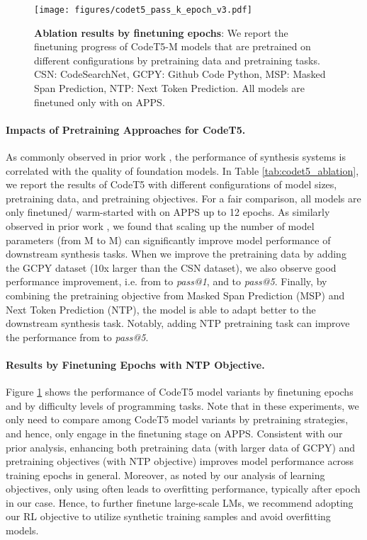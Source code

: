 \documentclass{article}
\begin{document}
\begin{figure}[t]
	\centering
	\resizebox{1.0\textwidth}{!} {
	\texttt{[image: figures/codet5\_pass\_k\_epoch\_v3.pdf]}
	}
	\caption{
	\textbf{Ablation results by finetuning epochs}:
	We report the finetuning progress of CodeT5-M models that are pretrained on different configurations by pretraining data and pretraining tasks. CSN: CodeSearchNet, GCPY: Github Code Python, MSP: Masked Span Prediction, NTP: Next Token Prediction. 
	All models are finetuned only with  on APPS.
	}
	\label{app_fig:codet5_apps}
\end{figure}

\paragraph{Impacts of Pretraining Approaches for CodeT5.}
As commonly observed in prior work \citep{austin2021program, chen2021evaluating, li2022competition}, the performance of synthesis systems is correlated with the quality of foundation models. 
In Table \ref{tab:codet5_ablation}, we report the results of CodeT5 with different configurations of model sizes, pretraining data, and pretraining objectives. 
For a fair comparison, all models are only finetuned/ warm-started with  on APPS up to 12 epochs. 
As similarly observed in prior work \citep{chen2021evaluating, austin2021program}, we found that scaling up the number of model parameters (from M to M) can significantly improve model performance of downstream synthesis tasks. 
When we improve the pretraining data by adding the GCPY dataset (10x larger than the CSN dataset), we also observe good performance improvement, i.e. from  to  \emph{pass@1}, and  to  \emph{pass@5}. 
Finally, by combining the pretraining objective from Masked Span Prediction (MSP) and Next Token Prediction (NTP), the model is able to adapt better to the downstream synthesis task.
Notably, adding NTP pretraining task can improve the performance from  to  \emph{pass@5}. 

\paragraph{Results by Finetuning Epochs with NTP Objective.}
Figure \ref{app_fig:codet5_apps} shows the performance of CodeT5 model variants by finetuning epochs and by difficulty levels of programming tasks. 
Note that in these experiments, we only need to compare among CodeT5 model variants by pretraining strategies, and hence, only engage   in the finetuning stage on APPS. 
Consistent with our prior analysis, enhancing both pretraining data (with larger data of GCPY) and pretraining objectives (with NTP objective) improves model performance across training epochs in general. 
Moreover, as noted by our analysis of learning objectives, only using  often leads to overfitting performance, typically after epoch  in our case.
Hence, to further finetune large-scale LMs, we recommend adopting our RL objective  to utilize synthetic training samples and avoid overfitting models.
\end{document}
